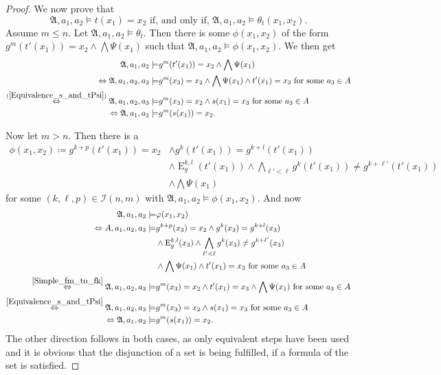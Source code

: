 \begin{proof}
	We now prove that 
	$$\mathfrak A, a_1,a_2\models t(x_1)=x_2 \text{ if, and only if, } \mathfrak A,a_1,a_2\models \theta_{t}(x_1,x_2).$$
	Assume $m\leq n$.
	Let $\mathfrak A, a_1,a_2 \models \theta_{t}$.
	Then there is some $\phi(x_1,x_2)$ of the form $g^{m}(t'(x_1))=x_2 \land \bigwedge \Psi(x_1)$ such that $\mathfrak A,a_1,a_2\models \phi(x_1,x_2)$.
	We then get
	\begin{align*}
		\mathfrak A,a_1,a_2 \models & g^{m}(t'(x_1))=x_2 \land \bigwedge \Psi(x_1) \\
		\Leftrightarrow \mathfrak A,a_1,a_2,a_3 \models & g^{m}(x_3)=x_2 \land \bigwedge \Psi(x_1) \land t'(x_1)=x_3 \text{ for some } a_3\in A \\
		\overset{(\ref{Equivalence_s_and_tPsi})}{\Leftrightarrow} \mathfrak A,a_1,a_2,a_3\models & g^{m}(x_3)=x_2 \land s(x_1)=x_3 \text{ for some } a_3\in A \\
		\Leftrightarrow \mathfrak A,a_1,a_2 \models & g^{m}(s(x_1))=x_2.
	\end{align*}
	
	Now let $m>n$.
	Then there is a
	\begin{align*}
		\phi(x_1,x_2)\coloneqq g^{k+p}(t'(x_1))=x_2 &\land g^{k}(t'(x_1))=g^{k+l}(t'(x_1)) \\
		& \land \operatorname{E}^{k,l}_g(t'(x_1)) \land \bigwedge_{\ell'<\ell} g^{k}(t'(x_1))\neq g^{k+\ell'}(t'(x_1)) \\
		& \land \bigwedge \Psi(x_1)
	\end{align*}
	for some $(k,\ell,p)\in\mathcal I(n,m)$ with $\mathfrak A,a_1,a_2\models \phi(x_1,x_2)$.
	And now
	\begin{align*}
		\mathfrak A,a_1,a_2 \models & \phi(x_1,x_2) \\
		\Leftrightarrow A,a_1,a_2,a_3 \models &g^{k+p}(x_3)=x_2 \land g^{k}(x_3)=g^{k+l}(x_3) \\
		& \land \operatorname{E}^{k,l}_g(x_3) \land \bigwedge_{\ell'<\ell} g^{k}(x_3)\neq g^{k+\ell'}(x_3) \\
		& \land \bigwedge\Psi(x_1) \land t'(x_1)=x_3 \text{ for some } a_3\in A \\
		\overset{\cref{Simple_fm_to_fk}}{\Leftrightarrow} \mathfrak A, a_1,a_2,a_3 \models & g^{m}(x_3)=x_2 \land t'(x_1)=x_3 \land \bigwedge\Psi(x_1) \text{ for some } a_3 \in A \\
		\overset{\cref{Equivalence_s_and_tPsi}}{\Leftrightarrow} \mathfrak A,a_1,a_2,a_3 \models & g^{m}(x_3)=x_2\land s(x_1)=x_3 \text{ for some } a_3\in A \\
		\Leftrightarrow \mathfrak A,a_1,a_2 \models & g^{m}(s(x_1))=x_2.
	\end{align*}
	The other direction follows in both cases, as only equivalent steps have been used and it is obvious that the disjunction of a set is being fulfilled, if a formula of the set is satisfied.
	

\end{proof}
